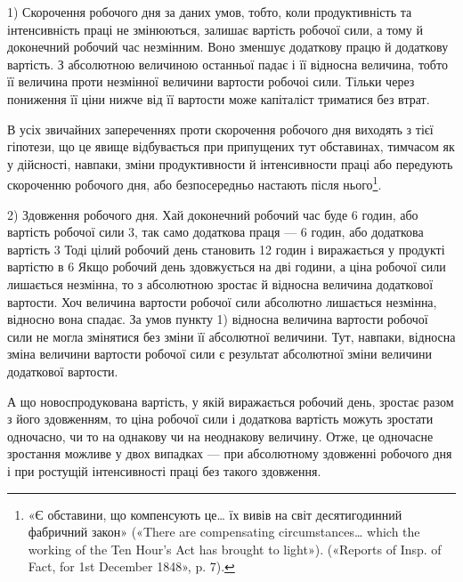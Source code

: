 \parcont{}  %
1) Скорочення робочого дня за даних умов, тобто, коли продуктивність
та інтенсивність праці не змінюються, залишає
вартість робочої сили, а тому й доконечний робочий час незмінним.
Воно зменшує додаткову працю й додаткову вартість. З абсолютною
величиною останньої падає і її відносна величина, тобто
її величина проти незмінної величини вартости робочоі сили.
Тільки через пониження її ціни нижче від її вартости може капіталіст
триматися без втрат.

В усіх звичайних запереченнях проти скорочення робочого
дня виходять з тієї гіпотези, що це явище відбувається при припущених
тут обставинах, тимчасом як у дійсності, навпаки, зміни
продуктивности й інтенсивности праці або передують скороченню
робочого дня, або безпосередньо настають після нього\footnote{
«Є обставини, що компенсують це\dots{} їх вивів на світ десятигодинний
фабричний закон» («There are compensating circumstances\dots{} which
the working of the Ten Hour’s Act has brought to light»). («Reports of
Insp. of Fact, for 1st December 1848», p. 7).
}.

2) Здовження робочого дня. Хай доконечний робочий час
буде 6 годин, або вартість робочої сили 3, так само додаткова
праця — 6 годин, або додаткова вартість 3
Тоді цілий робочий день становить 12 годин і виражається у
продукті вартістю в 6 Якщо робочий день здовжується
на дві години, а ціна робочої сили лишається незмінна, то з
абсолютною зростає й відносна величина додаткової вартости.
Хоч величина вартости робочої сили абсолютно лишається незмінна,
відносно вона спадає. За умов пункту 1) відносна величина
вартости робочої сили не могла змінятися без зміни її абсолютної
величини. Тут, навпаки, відносна зміна величини вартости
робочої сили є результат абсолютної зміни величини додаткової
вартости.

А що новоспродукована вартість, у якій виражається робочий
день, зростає разом з його здовженням, то ціна робочої сили
і додаткова вартість можуть зростати одночасно, чи то на однакову
чи на неоднакову величину. Отже, це одночасне зростання
можливе у двох випадках — при абсолютному здовженні робочого
дня і при ростущій інтенсивності праці без такого здовження.

